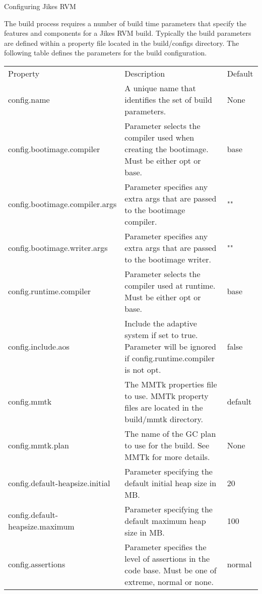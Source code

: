 \begin{chapter}{Configuring Jikes RVM}
\label{cha:configuringjikesrvm}

The build process requires a number of build time parameters that specify the features and components for a Jikes RVM build. Typically the build parameters are defined within a property file located in the build/configs directory. The following table defines the parameters for the build configuration.

\begin{table}
\centering
\begin{tabular}{p{0.25\linewidth}p{0.6\linewidth}p{0.15\linewidth}}
Property & Description & Default \\
config.name & A unique name that identifies the set of build parameters. & None \\
config.bootimage.\newline compiler & Parameter selects the compiler used when creating the bootimage. Must be either opt or base. & base \\
config.bootimage.\newline compiler.args & Parameter specifies any extra args that are passed to the bootimage compiler. & "" \\
config.bootimage.\newline writer.args & Parameter specifies any extra args that are passed to the bootimage writer. & "" \\
config.runtime.\newline compiler & Parameter selects the compiler used at runtime. Must be either opt or base. & base \\
config.include.\newline aos & Include the adaptive system if set to true. Parameter will be ignored if config.runtime.compiler is not opt. & false \\
config.mmtk & The MMTk properties file to use. MMTk property files are located in the build/mmtk directory. & default \\
config.mmtk.plan & The name of the GC plan to use for the build. See MMTk for more details. & None \\
config.default-heapsize.initial & Parameter specifying the default initial heap size in MB. & 20 \\
config.default-heapsize.maximum & Parameter specifying the default maximum heap size in MB. & 100 \\
config.assertions & Parameter specifies the level of assertions in the code base. Must be one of extreme, normal or none. & normal \\

\end{tabular}
\end{table}
\end{chapter}
